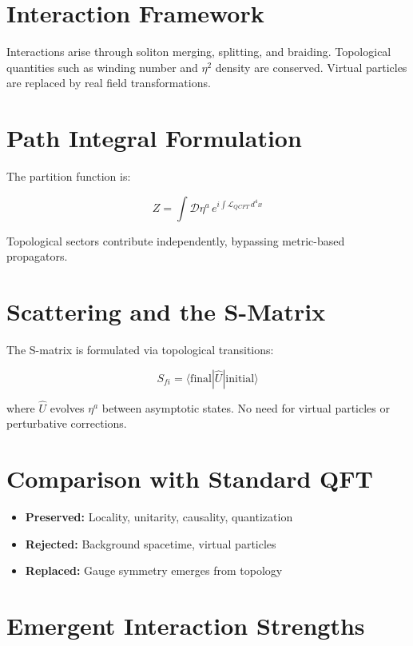 \documentclass[12pt]{article}
\begin{document}
\section{Interaction Framework}

Interactions arise through soliton merging, splitting, and braiding. Topological quantities such as winding number and $\eta^2$ density are conserved. Virtual particles are replaced by real field transformations.

\section{Path Integral Formulation}

The partition function is:

\[
Z = \int \mathcal{D}\eta^a \, e^{i \int \mathcal{L}_{QCFT} \, d^4x}
\]

Topological sectors contribute independently, bypassing metric-based propagators.

\section{Scattering and the S-Matrix}

The S-matrix is formulated via topological transitions:

\[
S_{fi} = \langle \text{final} | \hat{U} | \text{initial} \rangle
\]

where $\hat{U}$ evolves $\eta^a$ between asymptotic states. No need for virtual particles or perturbative corrections.

\section{Comparison with Standard QFT}

\begin{itemize}
    \item \textbf{Preserved:} Locality, unitarity, causality, quantization
    \item \textbf{Rejected:} Background spacetime, virtual particles
    \item \textbf{Replaced:} Gauge symmetry emerges from topology
\end{itemize}

\section{Emergent Interaction Strengths}
\end{document}
